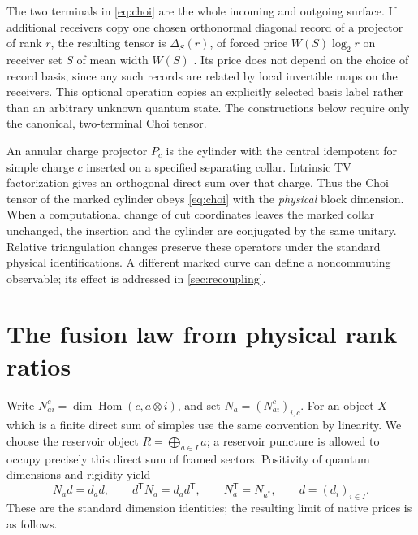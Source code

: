 \documentclass[11pt]{article}
\numberwithin{equation}{section}
\theoremstyle{definition}
\theoremstyle{remark}
\DeclareMathOperator{\Hom}{Hom}
\begin{document}
The two terminals in \eqref{eq:choi} are the whole incoming and outgoing surface. If additional receivers copy one chosen orthonormal diagonal record of a projector of rank \(r\), the resulting tensor is \(\Delta_S(r)\), of forced price \(W(S)\log_2 r\) on receiver set \(S\) of mean width \(W(S)\) \cite{OpenAIPrice}. Its price does not depend on the choice of record basis, since any such records are related by local invertible maps on the receivers. This optional operation copies an explicitly selected basis label rather than an arbitrary unknown quantum state. The constructions below require only the canonical, two-terminal Choi tensor.

An annular charge projector \(P_c\) is the cylinder with the central idempotent for simple charge \(c\) inserted on a specified separating collar. Intrinsic TV factorization gives an orthogonal direct sum over that charge. Thus the Choi tensor of the marked cylinder obeys \eqref{eq:choi} with the \emph{physical} block dimension. When a computational change of cut coordinates leaves the marked collar unchanged, the insertion and the cylinder are conjugated by the same unitary. Relative triangulation changes preserve these operators under the standard physical identifications. A different marked curve can define a noncommuting observable; its effect is addressed in \cref{sec:recoupling}.

\section{The fusion law from physical rank ratios}\label{sec:fusion}

Write \(N_{ai}^{c}=\dim\Hom(c,a\otimes i)\), and set \(N_a=(N_{ai}^{c})_{i,c}\). For an object \(X\) which is a finite direct sum of simples use the same convention by linearity. We choose the reservoir object \(R=\bigoplus_{a\in I}a\); a reservoir puncture is allowed to occupy precisely this direct sum of framed sectors. Positivity of quantum dimensions and rigidity yield
\begin{equation}\label{eq:pf}
  N_a d=d_a d,\qquad d^{\mathsf T}N_a=d_a d^{\mathsf T},
  \qquad N_a^{\mathsf T}=N_{a^*},\qquad d=(d_i)_{i\in I}.
\end{equation}
These are the standard dimension identities; the resulting limit of native prices is as follows.
\end{document}
